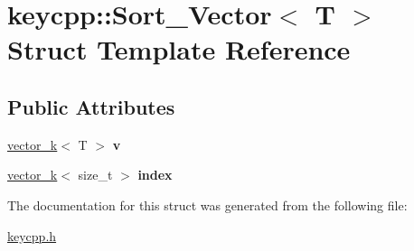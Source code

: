 \hypertarget{structkeycpp_1_1_sort___vector}{\section{keycpp\-:\-:Sort\-\_\-\-Vector$<$ T $>$ Struct Template Reference}
\label{structkeycpp_1_1_sort___vector}
}
\subsection*{Public Attributes}
\begin{DoxyCompactItemize}
\item 
\hypertarget{structkeycpp_1_1_sort___vector_a73081398ef2f44d6c4053e6579ee6683}{\hyperlink{classkeycpp_1_1vector__k}{vector\-\_\-k}$<$ T $>$ {\bfseries v}}\label{structkeycpp_1_1_sort___vector_a73081398ef2f44d6c4053e6579ee6683}

\item 
\hypertarget{structkeycpp_1_1_sort___vector_ab776635d9e46ad5b61280771bf6209db}{\hyperlink{classkeycpp_1_1vector__k}{vector\-\_\-k}$<$ size\-\_\-t $>$ {\bfseries index}}\label{structkeycpp_1_1_sort___vector_ab776635d9e46ad5b61280771bf6209db}

\end{DoxyCompactItemize}


The documentation for this struct was generated from the following file\-:\begin{DoxyCompactItemize}
\item 
\hyperlink{keycpp_8h}{keycpp.\-h}\end{DoxyCompactItemize}

